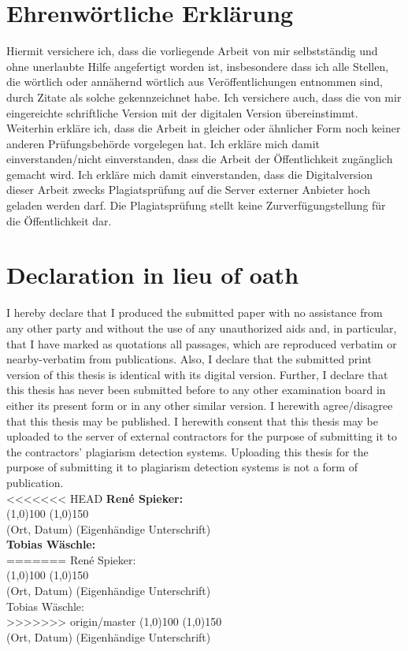 \clearpage

\section*{Ehrenwörtliche Erklärung}
Hiermit versichere ich, dass die vorliegende Arbeit von mir selbstständig und 
ohne unerlaubte Hilfe angefertigt worden ist, insbesondere dass ich alle Stellen, die wörtlich oder annähernd wörtlich aus Veröffentlichungen entnommen sind, durch Zitate als solche gekennzeichnet habe. Ich versichere auch, dass die von mir eingereichte schriftliche Version mit der digitalen Version übereinstimmt. 
Weiterhin erkläre ich, dass die Arbeit in gleicher oder ähnlicher Form noch keiner anderen Prüfungsbehörde vorgelegen hat. Ich erkläre mich damit einverstanden/nicht einverstanden, dass die Arbeit der Öffentlichkeit zugänglich gemacht wird. Ich erkläre mich damit einverstanden, dass die Digitalversion dieser Arbeit zwecks Plagiatsprüfung auf die Server externer Anbieter hoch geladen werden darf. Die Plagiatsprüfung stellt keine Zurverfügungstellung für die Öffentlichkeit dar.\section*{Declaration in lieu of oath}
I hereby declare that I produced the submitted paper with no assistance from any other party and without the use of any unauthorized aids and, in particular, that I have marked as quotations all passages, which are reproduced verbatim or nearby-verbatim from publications. Also, I declare that the submitted print version of this thesis is identical with  its digital version. Further, I declare that this thesis has never been submitted before to any other examination board in either its present form or in any other similar version. I herewith agree/disagree that this thesis may be published. 
I herewith consent that this thesis may be uploaded to the server of external contractors for the purpose of submitting it to the contractors’ plagiarism detection systems. Uploading this thesis for the purpose of submitting it to plagiarism detection systems is not a form of publication.\\[0.5cm]
<<<<<<< HEAD
\textbf{René Spieker:}\\[1cm]
\line(1,0){100} \hfill \line(1,0){150}\\
(Ort, Datum) \hfill (Eigenhändige Unterschrift)\\[1cm]
\textbf{Tobias Wäschle:}\\[1cm]
=======
René Spieker:\\[1cm]
\line(1,0){100} \hfill \line(1,0){150}\\
(Ort, Datum) \hfill (Eigenhändige Unterschrift)\\[1cm]
Tobias Wäschle:\\[1cm]
>>>>>>> origin/master
\line(1,0){100} \hfill \line(1,0){150}\\
(Ort, Datum) \hfill (Eigenhändige Unterschrift)






